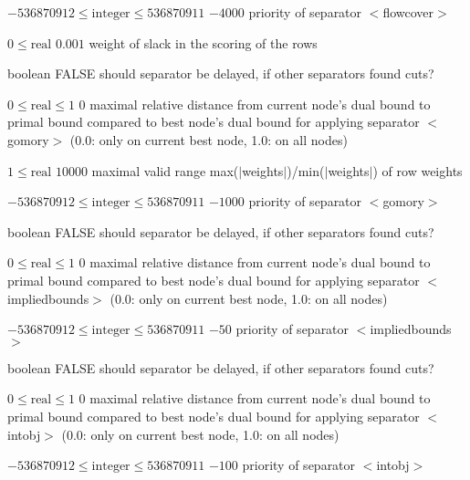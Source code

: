 %
{$-536870912\leq\textrm{integer}\leq536870911$}%
{$-4000$}%
{priority of separator $<$flowcover$>$}%
{}

%
{$0\leq\textrm{real}$}%
{$0.001$}%
{weight of slack in the scoring of the rows}%
{}

%
{boolean}%
{FALSE}%
{should separator be delayed, if other separators found cuts?}%
{}

%
{$0\leq\textrm{real}\leq1$}%
{$0$}%
{maximal relative distance from current node's dual bound to primal bound compared to best node's dual bound for applying separator $<$gomory$>$ (0.0: only on current best node, 1.0: on all nodes)}%
{}

%
{$1\leq\textrm{real}$}%
{$10000$}%
{maximal valid range max($|$weights$|$)/min($|$weights$|$) of row weights}%
{}

%
{$-536870912\leq\textrm{integer}\leq536870911$}%
{$-1000$}%
{priority of separator $<$gomory$>$}%
{}

%
{boolean}%
{FALSE}%
{should separator be delayed, if other separators found cuts?}%
{}

%
{$0\leq\textrm{real}\leq1$}%
{$0$}%
{maximal relative distance from current node's dual bound to primal bound compared to best node's dual bound for applying separator $<$impliedbounds$>$ (0.0: only on current best node, 1.0: on all nodes)}%
{}

%
{$-536870912\leq\textrm{integer}\leq536870911$}%
{$-50$}%
{priority of separator $<$impliedbounds$>$}%
{}

%
{boolean}%
{FALSE}%
{should separator be delayed, if other separators found cuts?}%
{}

%
{$0\leq\textrm{real}\leq1$}%
{$0$}%
{maximal relative distance from current node's dual bound to primal bound compared to best node's dual bound for applying separator $<$intobj$>$ (0.0: only on current best node, 1.0: on all nodes)}%
{}

%
{$-536870912\leq\textrm{integer}\leq536870911$}%
{$-100$}%
{priority of separator $<$intobj$>$}%
{}

